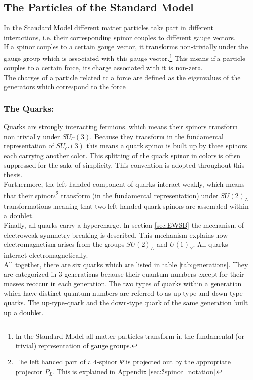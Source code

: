 \subsection{The Particles of the Standard Model}
In the Standard Model different matter particles take part in different interactions, i.e. their corresponding spinor couples to different gauge vectors.\\
If a spinor couples to a certain gauge vector, it transforms  non-trivially under the gauge group which is associated with this gauge vector.\footnote{In the Standard Model all matter particles transform in the fundamental (or trivial) representation of gauge groups.} This means if a particle couples to a certain force, its charge associated with it is non-zero.\\
The charges of a particle related to a force are defined as the eigenvalues of the generators which correspond to the force.
\subsubsection*{The Quarks:}
Quarks are strongly interacting fermions, which means their spinors transform non trivially under $SU_C(3)$. Because they transform in the fundamental representation of $SU_C(3)$ this means a quark spinor is built up by three spinors each carrying another color. This splitting of the quark spinor in colors is often suppressed for the sake of simplicity. This convention is adopted throughout this thesis.\\
Furthermore, the left handed component of quarks interact weakly, which means that their spinors\footnote{The left handed part of a 4-spinor $\Psi$ is projected out by the appropriate projector $P_L$. This is explained in Appendix \ref{sec:2spinor_notation}.} transform (in the fundamental representation) under $SU(2)_L$ transformations meaning that two left handed quark spinors are assembled within a doublet.\\
Finally, all quarks carry a hypercharge. In section \ref{sec:EWSB} the mechanism of electroweak symmetry breaking is described. This mechanism explains how electromagnetism arises from the groups $SU(2)_L$ and $U(1)_Y$. All quarks interact electromagnetically.\\
All together, there are six quarks which are listed in table \ref{tab:generations}. They are categorized in 3 generations because their quantum numbers except for their masses reoccur in each generation. The two types of quarks within a generation which have distinct quantum numbers are referred to as up-type and down-type quarks. The up-type-quark and the down-type quark of the same generation built up a doublet.
